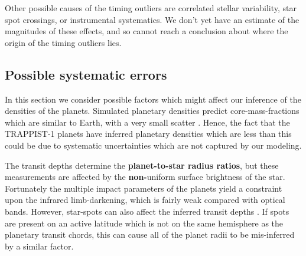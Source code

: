 \documentclass[twocolumn]{aastex63}
\begin{document}
Other possible causes of the timing outliers are correlated stellar variability, star spot crossings, or instrumental systematics.  We don't yet have an estimate of the magnitudes of these effects, and so cannot reach a conclusion about where the origin of the timing outliers lies.





\subsection{Possible systematic errors}

In this section we consider possible factors which might affect our
inference of the densities of the planets.  Simulated planetary
densities predict core-mass-fractions which are similar to
Earth, with a very small scatter \citep{Scora2020}.  Hence, the
fact that the TRAPPIST-1 planets have inferred planetary densities
which are less than this could be due to systematic uncertainties
which are not captured by our modeling.

The transit depths
determine the \textbf{planet-to-star radius ratios}, but these
measurements are affected by the \textbf{non-}uniform surface brightness
of the star.  Fortunately the multiple impact parameters of the
planets yield a constraint upon the infrared limb-darkening, which
is fairly weak compared with optical bands.  However, star-spots
can also affect the inferred transit depths \textbf{\citep{Czesla2009,Oshagh2013, 
Oshagh2014,McCullough2014, Rackham2018, Kipping2012b}}.  If spots are present 
on an active latitude
which is not on the same hemisphere as the planetary transit chords,
this can cause all of the planet radii to be mis-inferred by a similar
factor.
\end{document}
